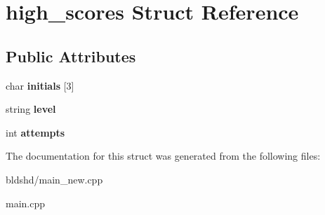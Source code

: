 \hypertarget{structhigh__scores}{\section{high\-\_\-scores Struct Reference}
\label{structhigh__scores}
}
\subsection*{Public Attributes}
\begin{DoxyCompactItemize}
\item 
\hypertarget{structhigh__scores_a1fd9e22c7b1eb1f22f5eeff4137dc099}{char {\bfseries initials} \mbox{[}3\mbox{]}}\label{structhigh__scores_a1fd9e22c7b1eb1f22f5eeff4137dc099}

\item 
\hypertarget{structhigh__scores_a795365f7f094ef4409e1b45d08dce4e5}{string {\bfseries level}}\label{structhigh__scores_a795365f7f094ef4409e1b45d08dce4e5}

\item 
\hypertarget{structhigh__scores_a74181814ba3549e0f8c18664b3fb235c}{int {\bfseries attempts}}\label{structhigh__scores_a74181814ba3549e0f8c18664b3fb235c}

\end{DoxyCompactItemize}


The documentation for this struct was generated from the following files\-:\begin{DoxyCompactItemize}
\item 
bldshd/main\-\_\-new.\-cpp\item 
main.\-cpp\end{DoxyCompactItemize}
